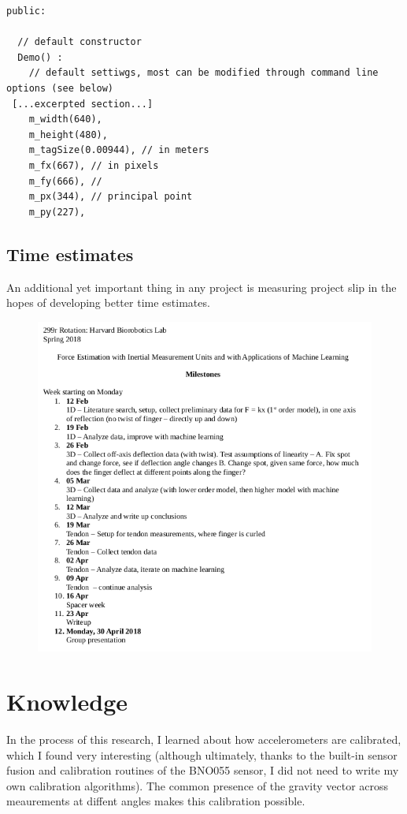 \documentclass[12pt]{article}
\begin{document}
\begin{lstlisting}
public:

  // default constructor
  Demo() :
    // default settiwgs, most can be modified through command line options (see below)
 [...excerpted section...]
    m_width(640),
    m_height(480),
    m_tagSize(0.00944), // in meters
    m_fx(667), // in pixels
    m_fy(666), //
    m_px(344), // principal point
    m_py(227),
\end{lstlisting}

\subsection{Time estimates}

An additional yet important thing in any project is measuring project slip in the hopes of
developing better time estimates. 

\begin{figure}[H]
\centering
\includegraphics[width=.8\textwidth]{images/misc/timeline.png}
\end{figure}


\section{Knowledge}

In the process of this research, I learned about how accelerometers are calibrated, which I found
very interesting (although ultimately, thanks to the built-in sensor fusion and calibration routines of the BNO055
sensor, I did not need to write my own calibration algorithms). The common presence of the gravity
vector across meaurements at diffent angles makes this calibration possible.
\end{document}
